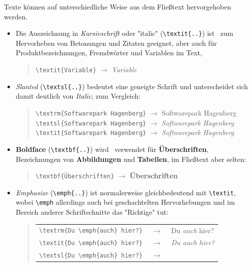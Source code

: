 Texte können auf unterschiedliche Weise aus dem Fließtext hervorgehoben werden.
%
\begin{itemize}
    \item Die Auszeichnung in \textit{Kursivschrift} oder "italic"
    (\verb!\textit{..}!) ist \va\ zum Hervorheben von Betonungen und Zitaten
    geeignet, aber auch für Produktbezeichnungen, Fremdwörter und Variablen
    im Text, \zB
    \begin{quote}
        \verb!\textit{Variable}! $\rightarrow$ \textit{Variable}
    \end{quote}

    \item \textsl{Slanted} %
    (\verb!\textsl{..}!) bedeutet eine geneigte Schrift und unterscheidet
    sich damit deutlich von \textit{Italic}; zum Vergleich:
    \begin{quote}
        \verb!\textrm{Softwarepark Hagenberg}! $\rightarrow$
        \textrm{Softwarepark Hagenberg} \newline%
        \verb!\textsl{Softwarepark Hagenberg}! $\rightarrow$
        \textsl{Softwarepark Hagenberg} \newline%
        \verb!\textit{Softwarepark Hagenberg}! $\rightarrow$ \textit{Softwarepark Hagenberg}
    \end{quote}
%
    \item \textbf{Boldface} (\verb!\textbf{..}!) wird \ia\ verwendet für
    \textbf{Überschriften}, Bezeichnungen von \textbf{Abbildungen} und
    \textbf{Tabellen}, im Fließtext aber selten:
    \begin{quote}
        \verb!\textbf{Überschriften}! $\rightarrow$ \textbf{Überschriften}
    \end{quote}
%
    \item \emph{Emphasize} (\verb!\emph{..}!) %
    ist normalerweise gleichbedeutend mit \verb!\textit!, wobei
    \verb!\emph! allerdings auch bei geschachtelten Hervorhebungen und im
    Bereich anderer Schriftschnitte das "Richtige" tut:
    \begin{quote}
        \setlength{\tabcolsep}{0pt}%
        \begin{tabular}{lcl}
            \verb!\textrm{Du \emph{auch} hier?}! & $\;\rightarrow\;$ &
            \textrm{Du \emph{auch} hier?} \\
            \verb!\textit{Du \emph{auch} hier?}! & $\;\rightarrow\;$ &
            \textit{Du \emph{auch} hier?} \\
            \verb!\textsl{Du \emph{auch} hier?}! & $\;\rightarrow\;$ &

\end{tabular}
\end{quote}
\end{itemize}
